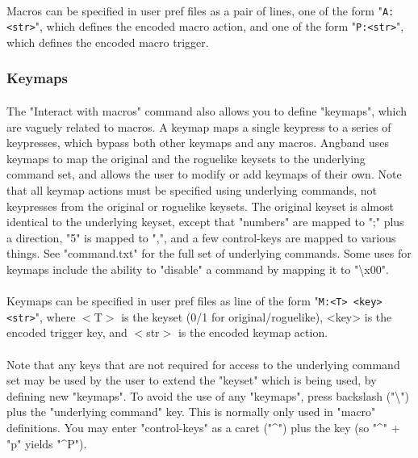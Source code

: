 \paragraph{}Macros can be specified in user pref files as a pair of
lines, one of the form "\verb+A:<str>+", which defines the encoded macro
action, and one of the form "\verb+P:<str>+", which defines the encoded macro
trigger.

\subsubsection{Keymaps}
\paragraph{}The "Interact with macros" command also allows you to define
"keymaps", which are vaguely related to macros. A keymap maps a single
keypress to a series of keypresses, which bypass both other keymaps and
any macros. Angband uses keymaps to map the original and the roguelike
keysets to the underlying command set, and allows the user to modify or
add keymaps of their own. Note that all keymap actions must be specified
using underlying commands, not keypresses from the original or roguelike
keysets. The original keyset is almost identical to the underlying
keyset, except that "numbers" are mapped to ";" plus a direction, "5" is
mapped to ",", and a few control-keys are mapped to various things. See
"command.txt" for the full set of underlying commands. Some uses for
keymaps include the ability to "disable" a command by mapping it to
"\textbackslash x00".

\paragraph{}Keymaps can be specified in user pref files as line of the
form "\verb+M:<T> <key> <str>+", where $<$T$>$ is the keyset (0/1 for
original/roguelike), <key> is the encoded trigger key, and $<$str$>$ is
the encoded keymap action.

\paragraph{}Note that any keys that are not required for access to the
underlying command set may be used by the user to extend the "keyset"
which is being used, by defining new "keymaps". To avoid the use of any
"keymaps", press backslash ("\textbackslash ") plus the "underlying
command" key. This is normally only used in "macro" definitions. You may
enter "control-keys" as a caret ("\^{}") plus the key (so "\^{}" + "p"
yields "\^{}P").


